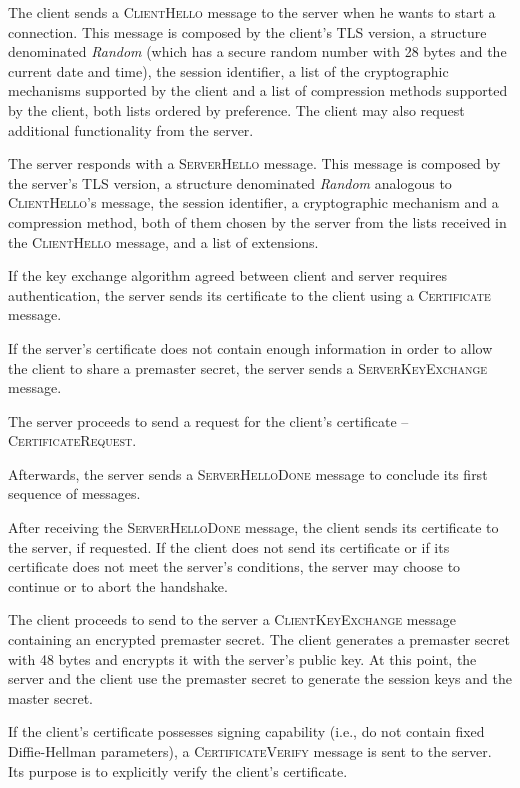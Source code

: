 \documentclass{sig-alternate-05-2015}
\newcommand{\msg}[1]{\textsc{{#1}}}
\begin{document}
The client sends a \msg{ClientHello} message to the server when he wants to start a connection.
This message is composed by the client's TLS version, a structure denominated \textit{Random} (which has a secure random number with 28 bytes and the current date and time), the session identifier, a list of the cryptographic mechanisms supported by the client and a list of compression methods supported by the client, both lists ordered by preference. The client may also request additional functionality from the server.

The server responds with a \msg{ServerHello} message. This message is composed by the server's TLS version, a structure denominated \textit{Random} analogous to \msg{ClientHello}'s message, the session identifier, a cryptographic mechanism and a compression method, both of them chosen by the server from the lists received in the \msg{ClientHello} message, and a list of extensions.

If the key exchange algorithm agreed between client and server requires authentication, the server sends its certificate to the client using a \msg{Certificate} message.

If the server's certificate does not contain enough information in order to allow the client to share a premaster secret, the server sends a \msg{ServerKeyExchange} message.

The server proceeds to send a request for the client's certificate -- \msg{CertificateRequest}.

Afterwards, the server sends a \msg{ServerHelloDone} message to conclude its first sequence of messages.

After receiving the \msg{ServerHelloDone} message, the client sends its certificate to the server, if requested.
If the client does not send its certificate or if its certificate does not meet the server's conditions, the server may choose to continue or to abort the handshake.

The client proceeds to send to the server a \msg{ClientKeyExchange} message containing an encrypted premaster secret. The client generates a premaster secret with 48 bytes and encrypts it with the server's public key. At this point, the server and the client use the premaster secret to generate the session keys and the master secret.

If the client's certificate possesses signing capability (i.e., do not contain fixed Diffie-Hellman parameters), a \msg{CertificateVerify} message is sent to the server. Its purpose is to explicitly verify the client's certificate.
\end{document}
